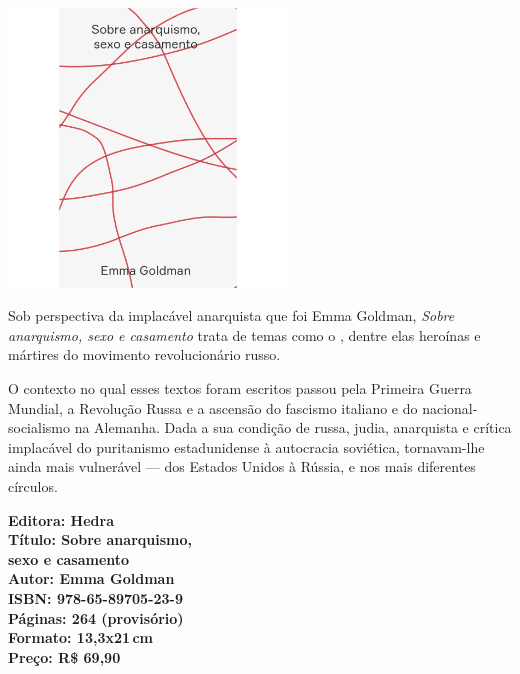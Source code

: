 \begin{center}
\hspace*{.5cm}\includegraphics[width=74mm]{./CAPAS/HEDRA_GOLDMAN.jpg}
\end{center}
\hspace*{-7cm}\hrulefill\hspace*{-7cm}
\medskip

\noindent{}Sob perspectiva da implacável anarquista que foi Emma Goldman, \textit{Sobre anarquismo, sexo e casamento} trata de temas como o , dentre elas heroínas e mártires do movimento revolucionário russo. 

O contexto no qual esses textos foram escritos passou pela Primeira Guerra Mundial, a Revolução Russa e a ascensão do fascismo italiano e do nacional-socialismo na Alemanha. Dada a sua condição de russa, judia, anarquista e crítica implacável do puritanismo estadunidense à autocracia soviética, tornavam-lhe ainda mais vulnerável --- dos Estados Unidos à Rússia, e nos mais diferentes círculos.

\vfill
\noindent\begin{minipage}[c]{.5\linewidth}
{\small\textbf{
\hspace*{-.1cm}Editora: Hedra\\
Título: Sobre anarquismo,\\sexo e casamento\\
Autor: Emma Goldman\\ 
ISBN: 978-65-89705-23-9\\
Páginas: 264 (provisório)\\
Formato: 13,3x21\,cm\\
Preço: R\$ 69,90\\
}}
\end{minipage}
\pagebreak

